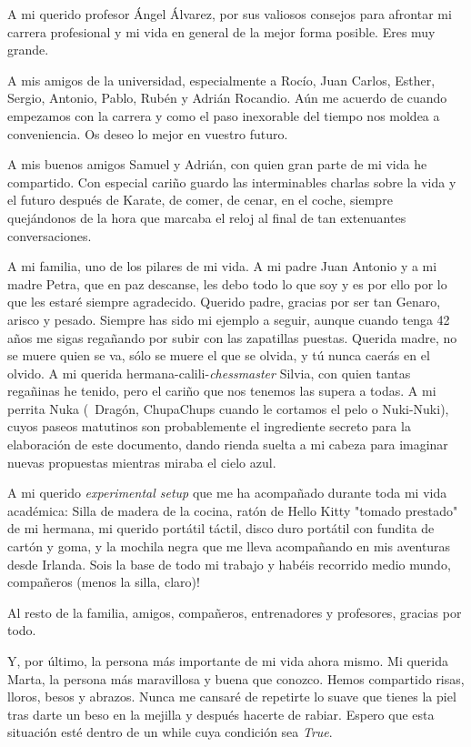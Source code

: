 A mi querido profesor Ángel Álvarez, por sus valiosos consejos para afrontar mi carrera profesional y mi vida en general de la mejor forma posible. Eres muy grande.

A mis amigos de la universidad, especialmente a Rocío, Juan Carlos, Esther, Sergio, Antonio, Pablo, Rubén y Adrián Rocandio. Aún me acuerdo de cuando empezamos con la carrera y como el paso inexorable del tiempo nos moldea a conveniencia. Os deseo lo mejor en vuestro futuro. 

A mis buenos amigos Samuel y Adrián, con quien gran parte de mi vida he compartido. Con especial cariño guardo las interminables charlas sobre la vida y el futuro después de Karate, de comer, de cenar, en el coche, siempre quejándonos de la hora que marcaba el reloj al final de tan extenuantes conversaciones. 

A mi familia, uno de los pilares de mi vida. A mi padre Juan Antonio y a mi madre Petra, que en paz descanse, les debo todo lo que soy y es por ello por lo que les estaré siempre agradecido. Querido padre, gracias por ser tan Genaro, arisco y pesado. Siempre has sido mi ejemplo a seguir, aunque cuando tenga 42 años me sigas regañando por subir con las zapatillas puestas. Querida madre, no se muere quien se va, sólo se muere el que se olvida, y tú nunca caerás en el olvido. A mi querida hermana-calili-\textit{chessmaster} Silvia, con quien tantas regañinas he tenido, pero el cariño que nos tenemos las supera a todas. A mi perrita Nuka (\aka \ Dragón, ChupaChups cuando le cortamos el pelo o Nuki-Nuki), cuyos paseos matutinos son probablemente el ingrediente secreto para la elaboración de este documento, dando rienda suelta a mi cabeza para imaginar nuevas propuestas mientras miraba el cielo azul. 

A mi querido \textit{experimental setup} que me ha acompañado durante toda mi vida académica: Silla de madera de la cocina, ratón de Hello Kitty "tomado prestado" de mi hermana, mi querido portátil táctil, disco duro portátil con fundita de cartón y goma, y la mochila negra que me lleva acompañando en mis aventuras desde Irlanda. Sois la base de todo mi trabajo y habéis recorrido medio mundo, compañeros (menos la silla, claro)!

Al resto de la familia, amigos, compañeros, entrenadores y profesores, gracias por todo.

Y, por último, la persona más importante de mi vida ahora mismo. Mi querida Marta, la persona más maravillosa y buena que conozco. Hemos compartido risas, lloros, besos y abrazos. Nunca me cansaré de repetirte lo suave que tienes la piel tras darte un beso en la mejilla y después hacerte de rabiar. Espero que esta situación esté dentro de un while cuya condición sea \textit{True}. 


